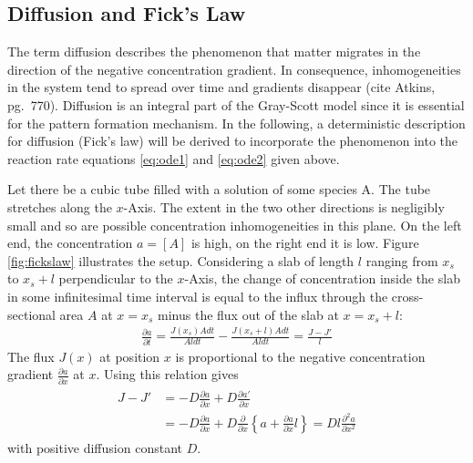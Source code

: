 \subsection{Diffusion and Fick's Law}
\label{det_diff}
The term diffusion describes the phenomenon that matter migrates in the direction of the negative concentration gradient. In consequence, inhomogeneities in the system tend to spread over time and gradients disappear (cite Atkins, pg.\ 770). Diffusion is an integral part of the Gray-Scott model since it is essential for the pattern formation mechanism. In the following, a deterministic description for diffusion (Fick's law) will be derived to incorporate the phenomenon into the reaction rate equations \eqref{eq:ode1} and \eqref{eq:ode2} given above. 

Let there be a cubic tube filled with a solution of some species A. The tube stretches along the $x$-Axis. The extent in the two other directions is negligibly small and so are possible concentration inhomogeneities in this plane. On the left end, the concentration $a = [A]$ is high, on the right end it is low. Figure \eqref{fig:fickslaw} illustrates the setup. Considering a slab of length $l$ ranging from $x_s$ to $x_s + l$ perpendicular to the $x$-Axis, the change of concentration inside the slab in some infinitesimal time interval is equal to the influx through the cross-sectional area $A$ at $x = x_s$ minus the flux out of the slab at $x = x_s + l$:
\begin{align}
\label{eq:diff_flux}
\frac{\partial a}{\partial t} = \frac{J(x_s) A dt}{A l dt} - \frac{J(x_s + l) A dt}{A l dt} = \frac{J - J'}{l}
\end{align}
The flux $J(x)$ at position $x$ is proportional to the negative concentration gradient $\frac{\partial a}{\partial x}$ at $x$. Using this relation gives 
\begin{align}
\begin{split}
J - J' &= -D \frac{\partial a}{\partial x} + D \frac{\partial a'}{\partial x} \\
&= -D \frac{\partial a}{\partial x} + D \frac{\partial}{\partial x} \left\{ a + \frac{\partial a}{\partial x} l \right\} 
= D l \frac{\partial^2 a}{\partial x^2}
\end{split}
\end{align}
with positive diffusion constant $D$. 

